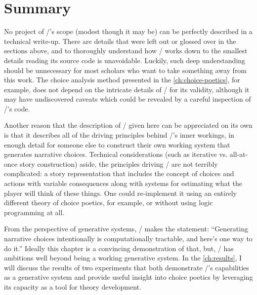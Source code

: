 \section{Summary}

No project of \dunyazad/'s scope (modest though it may be) can be perfectly described in a technical write-up.
%
There are details that were left out or glossed over in the sections above, and to thoroughly understand how \dunyazad/ works down to the smallest details reading its source code is unavoidable.
%
%
Luckily, such deep understanding should be unnecessary for most scholars who want to take something away from this work.
%
The choice analysis method presented in the \cref{ch:choice-poetics}, for example, does not depend on the intricate details of \dunyazad/ for its validity, although it may have undiscovered caveats which could be revealed by a careful inspection of \dunyazad/'s code.


Another reason that the description of \dunyazad/ given here can be appreciated on its own is that it describes all of the driving principles behind \dunyazad/'s inner workings, in enough detail for someone else to construct their own working system that generates narrative choices.
%
Technical considerations (such as iterative vs. all-at-once story construction) aside, the principles driving \dunyazad/ are not terribly complicated: a story representation that includes the concept of choices and actions with variable consequences along with systems for estimating what the player will think of these things.
%
One could re-implement it using an entirely different theory of choice poetics, for example, or without using logic programming at all.


From the perspective of generative systems, \dunyazad/ makes the statement: ``Generating narrative choices intentionally is computationally tractable, and here's one way to do it.''
%
Ideally this chapter is a convincing demonstration of that, but, \dunyazad/ has ambitions well beyond being a working generative system.
%
In the \cref{ch:results}, I will discuss the results of two experiments that both demonstrate \dunyazad/'s capabilities as a generative system and provide useful insight into choice poetics by leveraging its capacity as a tool for theory development.

\label{sec:dunyazad-summary}
